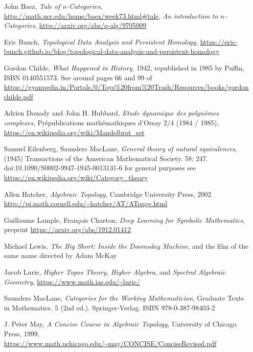 \documentclass{article}
\begin{document}
\begin{thebibliography}{99}

 John Baez, \textit{Tale of $n$-Categories}, \url{http://math.ucr.edu/home/baez/week73.html#tale}, \textit{An introduction to $n$-Categories}, \url{http://arxiv.org/abs/q-alg/9705009}

 Eric Bunch, \textit{Topological Data Analysis and Persistent Homology}, \url{https://eric-bunch.github.io/blog/topological-data-analysis-and-persistent-homology}

 Gordon Childe, \textit{What Happened in History}, 1942, republished in 1985 by Puffin, ISBN 0140551573. See around pages 66 and 99 of \url{https://gyanpedia.in/Portals/0/Toys%20from%20Trash/Resources/books/gordonchilde.pdf}

 Adrien Douady and John H. Hubbard, \textit{Etude dynamique des polyn\^omes complexes}, Pr\'epublications math\'emathiques d'Orsay 2/4 (1984 / 1985), \url{https://en.wikipedia.org/wiki/Mandelbrot_set}

 Samuel Eilenberg, Saunders MacLane, \textit{General theory of natural equivalences}, (1945) Transactions of the American Mathematical Society. 58: 247. doi:10.1090/S0002-9947-1945-0013131-6 for general purposes see \url{https://en.wikipedia.org/wiki/Category_theory}


 Allen Hatcher, \textit{Algebraic Topology}, Cambridge University Press, 2002 \url{http://pi.math.cornell.edu/~hatcher/AT/ATpage.html}

 Guillaume Lample, Fran\c cois Charton, \textit{Deep Learning for Symbolic Mathematics}, preprint \url{https://arxiv.org/abs/1912.01412}

 Michael Lewis, \textit{The Big Short: Inside the Doomsday Machine}, and the film of the same name directed by Adam McKay

 Jacob Lurie, \textit{Higher Topos Theory,} \textit{Higher Algebra}, and \textit{Spectral Algebraic Geometry}, \url{https://www.math.ias.edu/~lurie/}


 Saunders MacLane, \textit{Categories for the Working Mathematician}, Graduate Texts in Mathematics. 5 (2nd ed.). Springer-Verlag. ISBN 978-0-387-98403-2

 J. Peter May, \textit{A Concise Course in Algebraic Topology}, University of Chicago Press, 1999, \url{https://www.math.uchicago.edu/~may/CONCISE/ConciseRevised.pdf}


\end{thebibliography}
\end{document}
